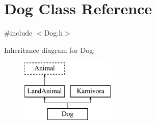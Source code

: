 \hypertarget{classDog}{\section{Dog Class Reference}
\label{classDog}
}


{\ttfamily \#include $<$Dog.\-h$>$}

Inheritance diagram for Dog\-:\begin{figure}[H]
\begin{center}
\leavevmode
\includegraphics[height=3.000000cm]{classDog}
\end{center}
\end{figure}
